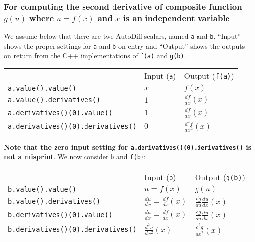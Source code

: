 \documentclass[letterpaper, 12 pt, onecolumn, journal]{IEEEtran}  %
\begin{document}
\subsubsection*{For computing the second derivative of composite function $g(u)$ where $u = f(x)$ and $x$ is an independent variable}
We assume below that there are two AutoDiff scalars, named \texttt{a} and \texttt{b}. ``Input'' shows the proper settings for \texttt{a} and \texttt{b} on entry and ``Output'' shows the outputs on return from the C++ implementations of \texttt{f(a)} and \texttt{g(b)}.
\begin{center}
\begin{tabular}{lll}
 & Input (\texttt{a}) & Output (\texttt{f(a)}) \\
\texttt{a.value().value()} & $x$ & $f(x)$ \\
\texttt{a.value().derivatives()} & $1$ & $\frac{df}{dx}(x)$ \\
\texttt{a.derivatives()(0).value()} & $1$ & $\frac{df}{dx}(x)$\\
\texttt{a.derivatives()(0).derivatives()} & $0$ & $\frac{d^2f}{dx^2}(x)$
\end{tabular}
\end{center}
\textbf{Note that the zero input setting for \texttt{a.derivatives()(0).derivatives()} is not a misprint}. We now consider \texttt{b} and \texttt{f(b)}:
\begin{center}
\begin{tabular}{lll}
 & Input (\texttt{b}) & Output (\texttt{g(b)}) \\
\texttt{b.value().value()} & $u = f(x)$ & $g(u)$ \\
\texttt{b.value().derivatives()} & $\frac{du}{dx} = \frac{df}{dx}(x)$ & $\frac{dg}{du}\frac{du}{dx}(x)$ \\
\texttt{b.derivatives()(0).value()} & $\frac{du}{dx} = \frac{df}{dx}(x)$ & $\frac{dg}{du}\frac{du}{dx}(x)$\\
\texttt{b.derivatives()(0).derivatives()} & $\frac{d^2u}{dx^2}(x)$ & $\frac{d^2g}{dx^2}(x)$
\end{tabular}
\end{center}
\end{document}
